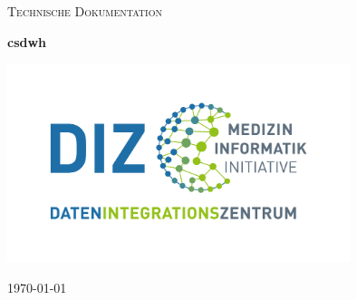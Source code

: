 \begin{titlepage}
	\thispagestyle{firstpage}
	
	\centering
	\vspace*{5cm}
	{\scshape\LARGE Technische Dokumentation\par}
	\vspace{1.5cm}
	{\huge \bfseries \ac{csdwh}\par}
	\vspace{2cm}
	 \includegraphics[width=10cm]{figures/diz.jpg}
	\vfill
	
	{\large \today\par}
\end{titlepage}